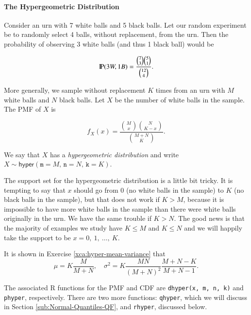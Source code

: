 \documentclass[captions=tableheading]{scrbook}
\begin{document}
\label{sec:non-bernoulli-trials}

\paragraph*{The Hypergeometric Distribution}
\label{sub:hypergeometric-dist}

Consider an urn with 7 white balls and 5 black balls. Let our random experiment be to randomly select 4 balls, without replacement, from the urn. Then the probability of observing 3 white balls (and thus 1 black ball) would be

\begin{equation}
\P(3W,1B)=\frac{{7 \choose 3}{5 \choose 1}}{{12 \choose 4}}.
\end{equation}

More generally, we sample without replacement \(K\) times from an urn with \(M\) white balls and \(N\) black balls. Let \(X\) be the number of white balls in the sample. The PMF of \(X\) is

\begin{equation}
f_{X}(x)=\frac{{M \choose x}{N \choose K-x}}{{M+N \choose K}}.
\end{equation}

We say that \(X\) has a \emph{hypergeometric distribution} and write \(X\sim\mathsf{hyper}(\mathtt{m}=M,\,\mathtt{n}=N,\,\mathtt{k}=K)\).

The support set for the hypergeometric distribution is a little bit tricky. It is tempting to say that \(x\) should go from 0 (no white balls in the sample) to \(K\) (no black balls in the sample), but that does not work if \(K>M\), because it is impossible to have more white balls in the sample than there were white balls originally in the urn. We have the same trouble if \(K>N\). The good news is that the majority of examples we study have \(K\leq M\) and \(K\leq N\) and we will happily take the support to be \(x=0,\ 1,\ \ldots,\ K\). 

It is shown in Exercise \ref{xca:hyper-mean-variance} that
\begin{equation}
\mu=K\frac{M}{M+N},\quad\sigma^{2}=K\frac{MN}{(M+N)^{2}}\frac{M+N-K}{M+N-1}.
\end{equation}

The associated \textsf{R} functions for the PMF and CDF are \texttt{dhyper(x, m, n, k)} and \texttt{phyper}, respectively. There are two more functions: \texttt{qhyper}, which we will discuss in Section \ref{sub:Normal-Quantiles-QF}, and \texttt{rhyper}, discussed below.
\end{document}
